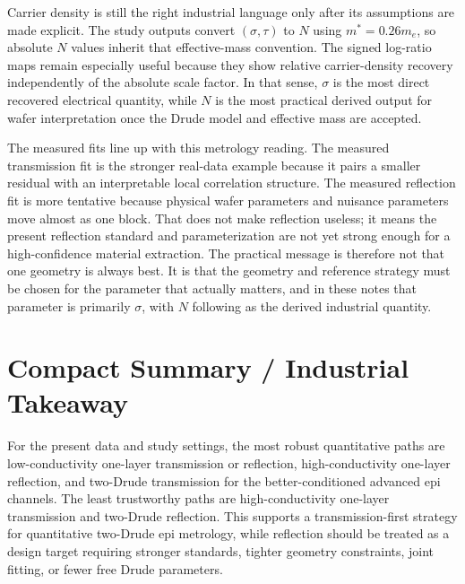 \documentclass[11pt]{article}
\newcommand{\mstar}{m^\ast}
\begin{document}
Carrier density is still the right industrial language only after its assumptions are made explicit. The study outputs convert \((\sigma,\tau)\) to \(N\) using \(\mstar=0.26m_e\), so absolute \(N\) values inherit that effective-mass convention. The signed log-ratio maps remain especially useful because they show relative carrier-density recovery independently of the absolute scale factor. In that sense, \(\sigma\) is the most direct recovered electrical quantity, while \(N\) is the most practical derived output for wafer interpretation once the Drude model and effective mass are accepted.

The measured fits line up with this metrology reading. The measured transmission fit is the stronger real-data example because it pairs a smaller residual with an interpretable local correlation structure. The measured reflection fit is more tentative because physical wafer parameters and nuisance parameters move almost as one block. That does not make reflection useless; it means the present reflection standard and parameterization are not yet strong enough for a high-confidence material extraction. The practical message is therefore not that one geometry is always best. It is that the geometry and reference strategy must be chosen for the parameter that actually matters, and in these notes that parameter is primarily \(\sigma\), with \(N\) following as the derived industrial quantity.

\section{Compact Summary / Industrial Takeaway}

For the present data and study settings, the most robust quantitative paths are low-conductivity one-layer transmission or reflection, high-conductivity one-layer reflection, and two-Drude transmission for the better-conditioned advanced epi channels. The least trustworthy paths are high-conductivity one-layer transmission and two-Drude reflection. This supports a transmission-first strategy for quantitative two-Drude epi metrology, while reflection should be treated as a design target requiring stronger standards, tighter geometry constraints, joint fitting, or fewer free Drude parameters.
\end{document}
